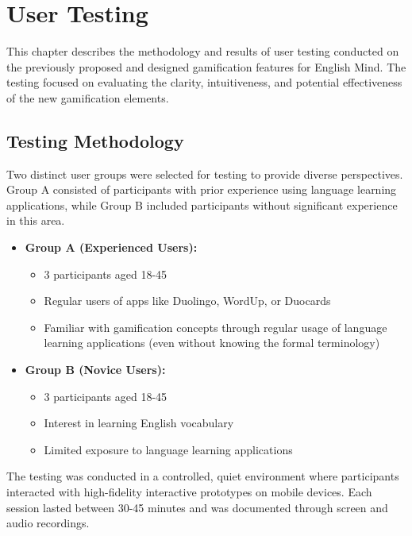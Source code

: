 \chapter{User Testing}

This chapter describes the methodology and results of user testing conducted on the previously proposed and designed gamification features for English Mind. The testing focused on evaluating the clarity, intuitiveness, and potential effectiveness of the new gamification elements.

\section{Testing Methodology}

Two distinct user groups were selected for testing to provide diverse perspectives. Group A consisted of participants with prior experience using language learning applications, while Group B included participants without significant experience in this area.

\begin{itemize}
    \item \textbf{Group A (Experienced Users):}
    \begin{itemize}
        \item 3 participants aged 18-45
        \item Regular users of apps like Duolingo, WordUp, or Duocards
        \item Familiar with gamification concepts through regular usage of language learning applications (even without knowing the formal terminology)
    \end{itemize}

    \item \textbf{Group B (Novice Users):}
    \begin{itemize}
        \item 3 participants aged 18-45
        \item Interest in learning English vocabulary
        \item Limited exposure to language learning applications
    \end{itemize}
\end{itemize}

The testing was conducted in a controlled, quiet environment where participants interacted with high-fidelity interactive prototypes on mobile devices. Each session lasted between 30-45 minutes and was documented through screen and audio recordings.

